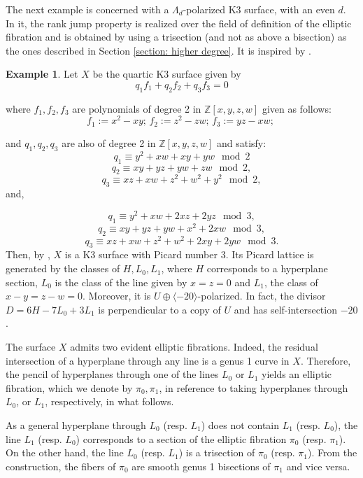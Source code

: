 \documentclass{amsart}
\theoremstyle{definition}
\newtheorem{example}[theorem]{Example}
\numberwithin{equation}{section}
\begin{document}
The next example is concerned with a $\Lambda_d$-polarized K3 surface, with an even $d$. In it, the rank jump property is realized over the field of definition of the elliptic fibration and is obtained by using a trisection (and not as above a bisection) as the ones described in Section \ref{section: higher degree}. It is inspired by \cite[Theorem 3.3]{NijghvL}.


\begin{example}\label{ex:even_d}
Let $X$ be the quartic K3 surface given by 
\begin{equation}
q_1f_1+q_2f_2+q_3f_3=0
\end{equation}
\end{example}
where $f_1, f_2, f_3$ are polynomials of degree 2 in $\mathbb{Z}[x,y,z,w]$ given as follows:
\[
f_1:=x^2-xy;\, f_2:=z^2-zw; \, f_3:= yz-xw; \
\]

and $q_1, q_2, q_3$ are also of degree 2  in $\mathbb{Z}[x,y,z,w]$ and satisfy:
$$q_1 \equiv y^2 +xw+xy +yw \mod 2$$
$$q_2 \equiv xy +yz +yw+zw \mod 2,$$
$$q_3 \equiv xz +xw+z^2 +w^2 +y^2 \mod 2,$$
and,

$$q_1 \equiv y^2 +xw+2xz +2yz \mod 3,$$
$$q_2 \equiv xy +yz +yw+x^2 +2xw \mod 3,$$
$$q_3 \equiv xz +xw+z^2 +w^2 +2xy +2yw \mod 3.$$
Then, by \cite[Thm. 3.3]{NijghvL}, $X$ is a K3 surface with Picard number 3.  Its Picard lattice is generated by the classes of $H, L_0, L_1$, where $H$ corresponds to a hyperplane section, $L_0$ is the class of the line given by  $x=z=0$ and $L_1$, the class of $x-y=z-w=0$. 
Moreover, it is $U\oplus \langle -20 \rangle$-polarized. In fact, the divisor $D=6H-7L_0+3L_1$ is perpendicular to a copy of $U$ and has self-intersection $-20$. 

The surface $X$ admits two evident elliptic fibrations. Indeed, the residual intersection of a hyperplane through any line is a genus 1 curve in $X$. Therefore, the  pencil of hyperplanes through one of the lines $L_0$ or $L_1$ yields an elliptic fibration, which we denote by $\pi_0, \pi_1$, in reference to taking hyperplanes through $L_0$, or $L_1$, respectively, in what follows.

As a general hyperplane through $L_0$ (resp. $L_1$) does not contain $L_1$ (resp. $L_0$), the line $L_1$ (resp. $L_0$) corresponds to a section of the elliptic fibration $\pi_0$ (resp. $\pi_1$). On the other hand, the line $L_0$ (resp. $L_1$) is a trisection of $\pi_0$ (resp. $\pi_1$). From the construction, the fibers of $\pi_0$ are smooth genus 1 bisections of $\pi_1$ and vice versa.
\end{document}
